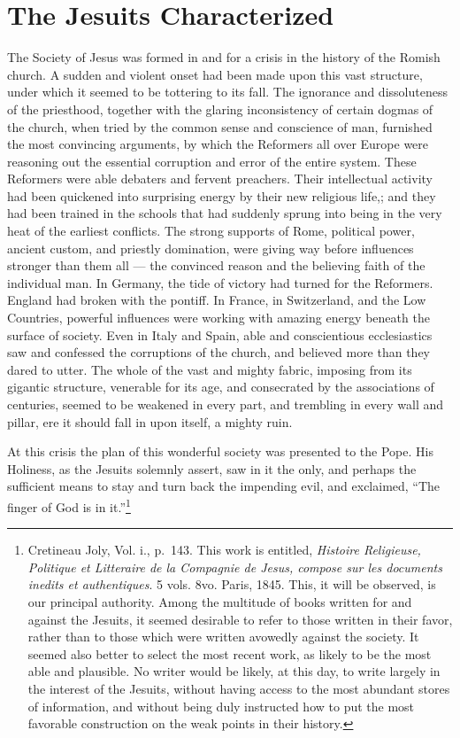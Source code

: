 \documentclass[]{book}
\let\rmarkdownfootnote\footnote%
\def\footnote{\protect\rmarkdownfootnote}
\begin{document}
\hypertarget{the-jesuits-characterized}{%
\chapter{The Jesuits Characterized}\label{the-jesuits-characterized}}

The Society of Jesus was formed in and for a crisis in the history of the Romish church. A sudden and violent onset had been made upon this vast structure, under which it seemed to be tottering to its fall. The ignorance and dissoluteness of the priesthood, together with the glaring inconsistency of certain dogmas of the church, when tried by the common sense and conscience of man, furnished the most convincing arguments, by which the Reformers all over Europe were reasoning out the essential corruption and error of the entire system. These Reformers were able debaters and fervent preachers. Their intellectual activity had been quickened into surprising energy by their new religious life,; and they had been trained in the schools that had suddenly sprung into being in the very heat of the earliest conflicts. The strong supports of Rome, political power, ancient custom, and priestly domination, were giving way before influences stronger than them all --- the convinced reason and the believing faith of the individual man. In Germany, the tide of victory had turned for the Reformers. England had broken with the pontiff. In France, in Switzerland, and the Low Countries, powerful influences were working with amazing energy beneath the surface of society. Even in Italy and Spain, able and conscientious ecclesiastics saw and confessed the corruptions of the church, and believed more than they dared to utter. The whole of the vast and mighty fabric, imposing from its gigantic structure, venerable for its age, and consecrated by the associations of centuries, seemed to be weakened in every part, and trembling in every wall and pillar, ere it should fall in upon itself, a mighty ruin.

At this crisis the plan of this wonderful society was presented to the Pope. His Holiness, as the Jesuits solemnly assert, saw in it the only, and perhaps the sufficient means to stay and turn back the impending evil, and exclaimed, ``The finger of God is in it.''\footnote{Cretineau Joly, Vol. i., p.~143. This work is entitled, \emph{Histoire Religieuse, Politique et Litteraire de la Compagnie de Jesus, compose sur les documents inedits et authentiques}. 5 vols. 8vo. Paris, 1845. This, it will be observed, is our principal authority. Among the multitude of books written for and against the Jesuits, it seemed desirable to refer to those written in their favor, rather than to those which were written avowedly against the society. It seemed also better to select the most recent work, as likely to be the most able and plausible. No writer would be likely, at this day, to write largely in the interest of the Jesuits, without having access to the most abundant stores of information, and without being duly instructed how to put the most favorable construction on the weak points in their history.}
\end{document}

